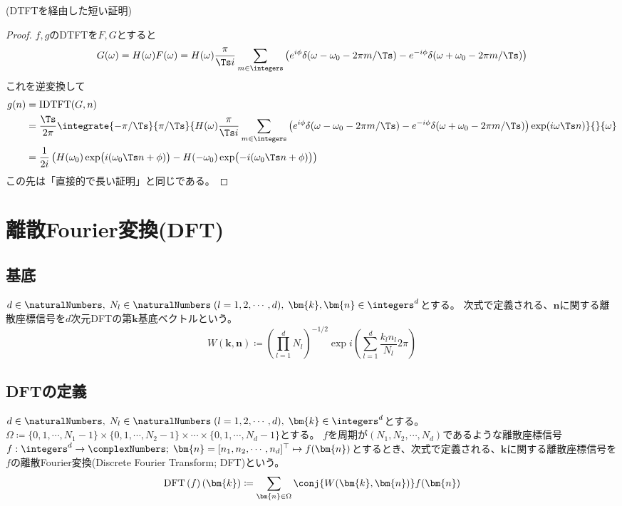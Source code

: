 			(DTFTを経由した短い証明)
			\begin{proof}
				\quad\par
				$f,g$のDTFTを$F,G$とすると
				\[ G(\omega) = H(\omega)F(\omega) = H(\omega)\frac{\pi}{\Ts i}\sum_{m\in\integers}\left(e^{i\phi}\delta(\omega-\omega_0 - 2\pi m/\Ts) - e^{-i\phi}\delta(\omega+\omega_0 - 2\pi m/\Ts)\right) \]
				これを逆変換して
				\begin{align*}
					g(n) &= \text{IDTFT}(G,n) \\
					&= \frac{\Ts}{2\pi}\integrate{-\pi/\Ts}{\pi/\Ts}{H(\omega)\frac{\pi}{\Ts i}\sum_{m\in\integers}\left(e^{i\phi}\delta(\omega-\omega_0 - 2\pi m/\Ts) - e^{-i\phi}\delta(\omega+\omega_0 - 2\pi m/\Ts)\right)\exp(i\omega\Ts n)}{}{\omega} \\
					&= \frac{1}{2i}\left(H(\omega_0)\exp\bigl(i(\omega_0\Ts n+\phi)\bigr) - H(-\omega_0)\exp\bigl(-i(\omega_0\Ts n+\phi)\bigr)\right)
				\end{align*}
				この先は「直接的で長い証明」と同じである。
			\end{proof}
			\let\Ts\undefined
	\chapter{離散Fourier変換(DFT)}
		\newcommand{\DFT}[1]{\mathrm{DFT}\left(#1\right)}
		\newcommand{\DFTwithArg}[2]{\DFT{#1}\left(#2\right)}

		\section{基底}
			$d\in\naturalNumbers,\;N_l\in\naturalNumbers\;(l=1,2,\cdots,d),\;\bm{k},\bm{n}\in\integers^d$とする。
			次式で定義される、$\bm{n}$に関する離散座標信号を$d$次元DFTの第$\bm{k}$基底ベクトルという。
			\[ W(\bm{k},\bm{n}) \coloneqq \left(\prod_{l=1}^d N_l\right)^{-1/2} \exp i\left(\sum_{l=1}^d \frac{k_l n_l}{N_l}2\pi\right)\]

		\section{DFTの定義}
			\label{DFTの定義}
			$d\in\naturalNumbers,\;N_l\in\naturalNumbers\;(l=1,2,\cdots,d),\;\bm{k}\in\integers^d$とする。
			$\Omega \coloneqq \{0,1,\cdots,N_1-1\}\times\{0,1,\cdots,N_2-1\}\times\cdots\times\{0,1,\cdots,N_d-1\}$とする。
			$f$を周期が$(N_1,N_2,\cdots,N_d)$であるような離散座標信号$f: \integers^d\to\complexNumbers;\;\bm{n} = [n_1,n_2,\cdots,n_d]^\top \mapsto f(\bm{n})$とするとき、次式で定義される、$\bm{k}$に関する離散座標信号を$f$の離散Fourier変換(Discrete Fourier Transform; DFT)という。
			\[ \DFTwithArg{f}{\bm{k}} \coloneqq \sum_{\bm{n}\in\Omega} \conj{W(\bm{k},\bm{n})} f(\bm{n}) \]

